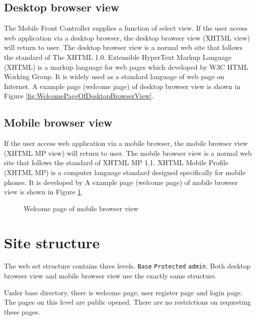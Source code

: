 \subsection{Desktop browser view}
\label{sec:WebApplication:DualView:DesktopBrowserView}

The Mobile Front Controller supplies a function of select view. If the user access web application via a desktop browser, the desktop browser view (XHTML view) will return to user. The desktop browser view is a normal web site that follows the standard of The XHTML 1.0. Extensible HyperText Markup Language (XHTML\label{sym:XHTML}) is a markup language for web pages which developed by W3C HTML Working Group. It is widely used as a standard language of web page on Internet. A example page (welcome page) of desktop browser view is shown in Figure \ref{fig:WelcomePageOfDesktopBrowserView}.

\subsection{Mobile browser view}
\label{sec:WebApplication:DualView:MobileBrowserView}

If the user access web application via a mobile browser, the mobile browser view (XHTML MP view) will return to user. The mobile browser view is a normal web site that follows the standard of XHTML MP 1.1. XHTML Mobile Profile (XHTML MP) is a computer language standard designed specifically for mobile phones. It is developed by  A example page (welcome page) of mobile browser view is shown in Figure \ref{fig:WelcomePageOfMobileBrowserview}.

\begin{figure}[!hbtp]
\centering
{}
\caption{Welcome page of mobile browser view}
\label{fig:WelcomePageOfMobileBrowserview}
\end{figure} 

\section{Site structure}
\label{sec:WebApplication:SiteStructure}

The web set structure contains three levels. \texttt{Base} \textrightarrow{} \texttt{Protected} \textrightarrow{} \texttt{admin}. Both desktop browser view and mobile browser view use the exactly same structure. 

Under base directory, there is welcome page, user register page and login page. The pages on this level are public opened. There are no restrictions on requesting these pages. 

